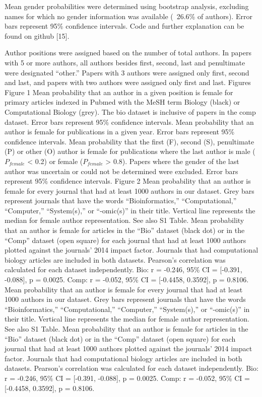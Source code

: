 \documentclass[11pt]{article}
\begin{document}
Mean gender probabilities were determined using bootstrap analysis, excluding names for which no gender information was available (~26.6\% of authors). Error bars represent 95\% confidence intervals. Code and further explanation can be found on github [15].

Author positions were assigned based on the number of total authors. In papers with 5 or more authors, all authors besides first, second, last and penultimate were designated “other.” Papers with 3 authors were assigned only first, second and last, and papers with two authors were assigned only first and last.
Figures
Figure 1
Mean probability that an author in a given position is female for primary articles indexed in Pubmed with the MeSH term Biology (black) or Computational Biology (grey). The bio dataset is inclusive of papers in the comp dataset. Error bars represent 95\% confidence intervals.
Mean probability that an author is female for publications in a given year. Error bars represent 95\% confidence intervals.
Mean probability that the first (F), second (S), penultimate (P) or other (O) author is female for publications where the last author is male ($P_{female}$ < 0.2) or female ($P_{female}$ > 0.8). Papers where the gender of the last author was uncertain or could not be determined were excluded. Error bars represent 95\% confidence intervals.
Figure 2
Mean probability that an author is female for every journal that had at least 1000 authors in our dataset. Grey bars represent journals that have the words “Bioinformatics,” “Computational,” “Computer,” “System(s),” or “-omic(s)” in their title. Vertical line represents the median for female author representation. See also S1 Table.
Mean probability that an author is female for articles in the “Bio” dataset (black dot) or in the “Comp” dataset (open square) for each journal that had at least 1000 authors plotted against the journals’ 2014 impact factor. Journals that had computational biology articles are included in both datasets. Pearson’s correlation was calculated for each dataset independently. Bio: r = -0.246, 95\% CI = [-0.391, -0.088], p = 0.0025. Comp: r = -0.052, 95\% CI = [-0.4458, 0.3592], p = 0.8106.
Mean probability that an author is female for every journal that had at least 1000 authors in our dataset. Grey bars represent journals that have the words “Bioinformatics,” “Computational,” “Computer,” “System(s),” or “-omic(s)” in their title. Vertical line represents the median for female author representation. See also S1 Table.
Mean probability that an author is female for articles in the “Bio” dataset (black dot) or in the “Comp” dataset (open square) for each journal that had at least 1000 authors plotted against the journals’ 2014 impact factor. Journals that had computational biology articles are included in both datasets. Pearson’s correlation was calculated for each dataset independently. Bio: r = -0.246, 95\% CI = [-0.391, -0.088], p = 0.0025. Comp: r = -0.052, 95\% CI = [-0.4458, 0.3592], p = 0.8106.
\end{document}
